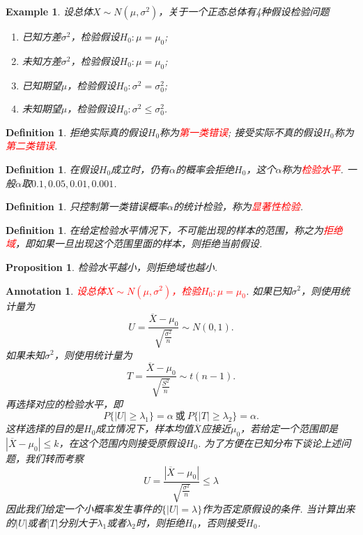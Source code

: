 \documentclass{article}
\newtheorem{proposition}[theorem]{Proposition}
\newtheorem{example}[theorem]{Example}
\newtheorem{definition}[theorem]{Definition}
\newtheorem{annotation}[theorem]{Annotation}
\newcommand{\redt}[1]{\textcolor{red}{#1}}
\begin{document}
\begin{example}
\rm 设总体$X \sim N(\mu,\sigma^2)$，关于一个正态总体有4种假设检验问题
\begin{enumerate}
	\item 已知方差$\sigma^2$，检验假设$H_0: \mu = \mu_0$;
	\item 未知方差$\sigma^2$，检验假设$H_0: \mu = \mu_0$;
	\item 已知期望$\mu$，检验假设$H_0: \sigma^2 = \sigma_0^2$;
	\item 未知期望$\mu$，检验假设$H_0: \sigma^2 \leq \sigma_0^2$.
\end{enumerate}
\end{example}

\begin{definition}
\rm 拒绝实际真的假设$H_0$称为\redt{第一类错误}; 接受实际不真的假设$H_0$称为\redt{第二类错误}.
\end{definition}

\begin{definition}
\rm 在假设$H_0$成立时，仍有$\alpha$的概率会拒绝$H_0$，这个$\alpha$称为\redt{检验水平}. 一般$\alpha$取$0.1,0.05,0.01,0.001$. 
\end{definition}

\begin{definition}
\rm 只控制第一类错误概率$\alpha$的统计检验，称为\redt{显著性检验}.
\end{definition}

\begin{definition}
\rm 在给定检验水平情况下，不可能出现的样本的范围，称之为\redt{拒绝域}，即如果一旦出现这个范围里面的样本，则拒绝当前假设. 
\end{definition}

\begin{proposition}
\rm 检验水平越小，则拒绝域也越小. 
\end{proposition}

\begin{annotation}
\rm \redt{设总体$X \sim N(\mu,\sigma^2)$，检验$H_0: \mu=\mu_0$}. 如果已知$\sigma^2$，则使用统计量为
$$
U = \frac{\overline{X}-\mu_0}{\sqrt{\frac{\sigma^2}{n}}} \sim N(0,1).
$$
如果未知$\sigma^2$，则使用统计量为
$$
T = \frac{\overline{X}-\mu_0}{\sqrt{\frac{S^2}{n}}} \sim t(n-1).
$$
再选择对应的检验水平，即
$$
P\{|U| \geq \lambda_1 \} = \alpha~\text{或} ~ P\{|T| \geq \lambda_2 \} = \alpha.
$$
这样选择的目的是$H_0$成立情况下，样本均值$\overline{X}$应接近$\mu_0$，若给定一个范围即是$|\overline{X} - \mu_0| \leq k$，在这个范围内则接受原假设$H_0$. 为了方便在已知分布下谈论上述问题，我们转而考察
$$
U = \frac{|\overline{X} - \mu_0|}{\sqrt{\frac{\sigma^2}{n}}} \leq \lambda
$$
因此我们给定一个小概率发生事件的$\{|U|=\lambda\}$作为否定原假设的条件. 
当计算出来的$|U|$或者$|T|$分别大于$\lambda_1$或者$\lambda_2$时，则拒绝$H_0$，否则接受$H_0$.
\end{annotation}
\end{document}
